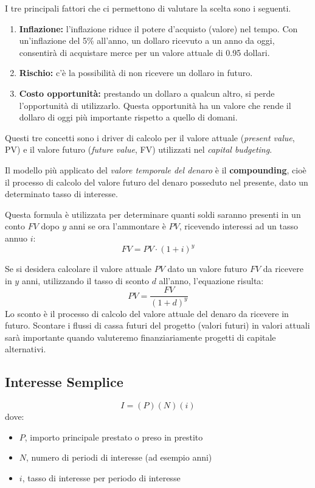 \documentclass[a4paper,portrait,12pt]{article}
\theoremstyle{definition}
\begin{document}
I tre principali fattori che ci permettono di valutare la scelta sono i seguenti.
\begin{enumerate}
\item \textbf{Inflazione:} l'inflazione riduce il potere d'acquisto (valore) nel tempo.
Con un'inflazione del 5\% all'anno, un dollaro ricevuto a un anno da oggi,
consentirà di acquistare merce per un valore attuale di 0.95 dollari.
\item \textbf{Rischio:} c'è la possibilità  di non ricevere un dollaro in futuro.
\item \textbf{Costo opportunità:} prestando un dollaro a qualcun altro, si perde l'opportunità di utilizzarlo.
Questa opportunità ha un valore che rende il dollaro di oggi più importante rispetto a quello di domani.
\end{enumerate}

Questi tre concetti sono i driver di calcolo per il valore attuale (\emph{present value}, PV) e il valore futuro (\emph{future value}, FV) utilizzati nel \emph{capital budgeting}.


Il modello più applicato del \emph{valore temporale del denaro} è il \textbf{compounding}, cioè il processo di calcolo del valore futuro del denaro posseduto nel presente, dato un determinato tasso di interesse.

Questa formula è utilizzata per determinare quanti soldi saranno presenti in un conto $FV$ dopo $y$ anni se ora l'ammontare è $PV$, ricevendo interessi ad un tasso annuo $i$:
$$
FV = PV \cdot (1 + i)^y
$$

Se si desidera calcolare il valore attuale $PV$ dato un valore futuro $FV$ da ricevere in $y$ anni, utilizzando il tasso di sconto $d$ all'anno, l'equazione risulta:
$$
PV = \frac{FV}{(1+d)^y}
$$
Lo sconto è il processo di calcolo del valore attuale del denaro da ricevere in futuro.
Scontare i flussi di cassa futuri del progetto (valori futuri) in valori attuali sarà importante quando valuteremo finanziariamente progetti di capitale alternativi.\\

\subsection{Interesse Semplice}
$$
I = (P) (N) (i)
$$
dove:
\begin{itemize}
\item $P$, importo principale prestato o preso in prestito
\item $N$, numero di periodi di interesse (ad esempio anni)
\item $i$, tasso di interesse per periodo di interesse
\end{itemize}
\end{document}
